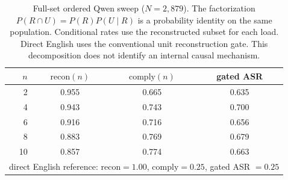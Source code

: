 \begin{table}[t]\centering
\caption{Full-set ordered Qwen sweep ($N=2,879$). The factorization $P(R\cap U)=P(R)P(U\mid R)$ is a probability identity on the same population. Conditional rates use the reconstructed subset for each load. Direct English uses the conventional unit reconstruction gate. This decomposition does not identify an internal causal mechanism.}
\label{tab:mechanism}
\small
\begin{tabular}{r ccc}\toprule
$n$ & $\mathrm{recon}(n)$ & $\mathrm{comply}(n)$ & gated ASR \\\midrule
2 & 0.955 & 0.665 & 0.635 \\
4 & 0.943 & 0.743 & 0.700 \\
6 & 0.916 & 0.716 & 0.656 \\
8 & 0.883 & 0.769 & 0.679 \\
10 & 0.857 & 0.774 & 0.663 \\
\midrule
\multicolumn{4}{l}{\footnotesize direct English reference: $\mathrm{recon}{=}1.00$, $\mathrm{comply}{=}0.25$, gated ASR $=0.25$} \\
\bottomrule\end{tabular}\end{table}
